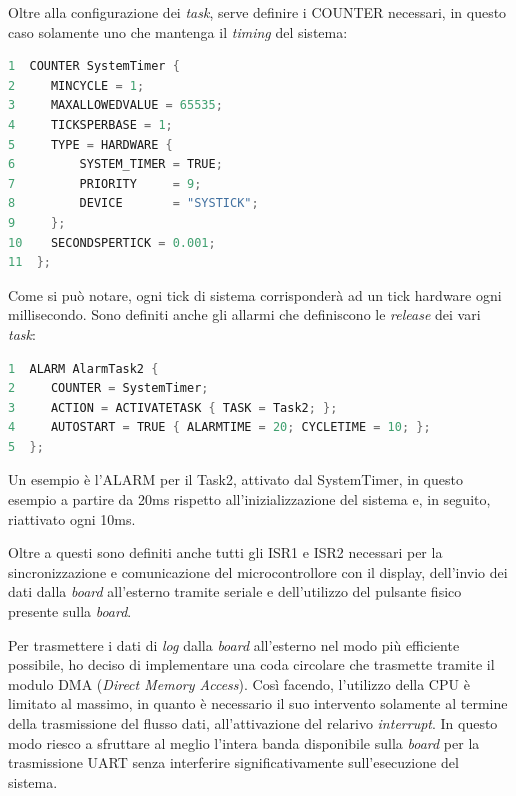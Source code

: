 \documentclass{article}
\begin{document}
Oltre alla configurazione dei \textit{task}, serve definire i COUNTER necessari, in questo caso solamente uno che mantenga il \textit{timing} del sistema:
\begin{lstlisting}[language=C]
1  COUNTER SystemTimer {
2	  MINCYCLE = 1;                
3	  MAXALLOWEDVALUE = 65535;    
4	  TICKSPERBASE = 1;            
5	  TYPE = HARDWARE {          
6		  SYSTEM_TIMER = TRUE;
7		  PRIORITY     = 9;         
8		  DEVICE       = "SYSTICK";
9	  };
10	  SECONDSPERTICK = 0.001; 
11  };
\end{lstlisting}
Come si può notare, ogni tick di sistema corrisponderà ad un tick hardware ogni millisecondo.
Sono definiti anche gli allarmi che definiscono le \textit{release} dei vari \textit{task}:
\begin{lstlisting}[language=C]
1  ALARM AlarmTask2 {
2	  COUNTER = SystemTimer;
3	  ACTION = ACTIVATETASK { TASK = Task2; };
4	  AUTOSTART = TRUE { ALARMTIME = 20; CYCLETIME = 10; };
5  };
\end{lstlisting}
Un esempio è l'ALARM per il Task2, attivato dal SystemTimer, in questo esempio a partire da 20ms rispetto all'inizializzazione del sistema e, in seguito, riattivato ogni 10ms.

Oltre a questi sono definiti anche tutti gli ISR1 e ISR2 necessari per la sincronizzazione e comunicazione del microcontrollore con il display, dell'invio dei dati dalla \textit{board} all'esterno tramite seriale e dell'utilizzo del pulsante fisico presente sulla \textit{board}.

Per trasmettere i dati di \textit{log} dalla \textit{board} all'esterno nel modo più efficiente possibile, ho deciso di implementare una coda circolare che trasmette tramite il modulo DMA (\textit{Direct Memory Access}). Così facendo, l'utilizzo della CPU è limitato al massimo, in quanto è necessario il suo intervento solamente al termine della trasmissione del flusso dati, all'attivazione del relarivo \textit{interrupt}. In questo modo riesco a sfruttare al meglio l'intera banda disponibile sulla \textit{board} per la trasmissione UART senza interferire significativamente sull'esecuzione del sistema.
\end{document}
